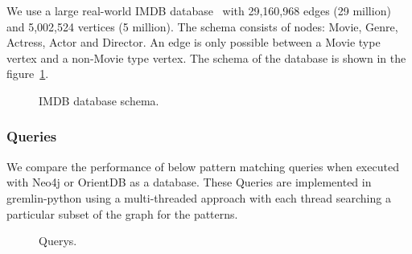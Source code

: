 We use a large real-world IMDB database~\cite{IMDb96:online} with 29,160,968 edges (29 million) and 5,002,524 vertices (5 million). The schema consists of nodes: Movie, Genre,
Actress, Actor and Director. An edge is only possible between a Movie type vertex and a non-Movie type vertex. 
The schema of the database is shown in the figure~\ref{fig:schema}. 

\begin{figure}[t]
\centering
{}
\caption{IMDB database schema.}
\label{fig:schema}
\centering
\end{figure}

\subsubsection{Queries}

We compare the performance of below pattern matching queries when executed with Neo4j or OrientDB as a database. These Queries are implemented in gremlin-python using a multi-threaded approach with each thread searching a particular subset of the graph for the patterns. 


 \begin{figure}[t]
\centering
{}
\caption{Querys.}
\label{fig:query}
\centering
\end{figure} 

